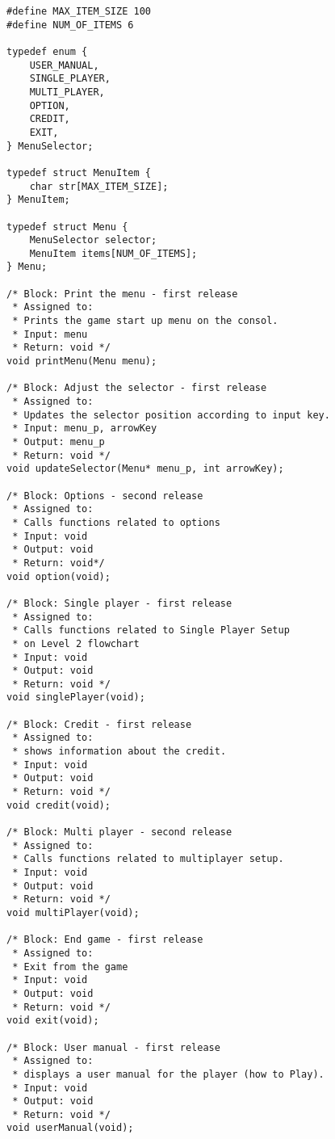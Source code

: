 \begin{verbatim}
#define MAX_ITEM_SIZE 100
#define NUM_OF_ITEMS 6

typedef enum {
	USER_MANUAL,
	SINGLE_PLAYER,
	MULTI_PLAYER,
	OPTION,
	CREDIT,
	EXIT,	
} MenuSelector;

typedef struct MenuItem {
	char str[MAX_ITEM_SIZE];
} MenuItem;

typedef struct Menu {
	MenuSelector selector;
	MenuItem items[NUM_OF_ITEMS];
} Menu;

/* Block: Print the menu - first release
 * Assigned to:
 * Prints the game start up menu on the consol.
 * Input: menu
 * Return: void */
void printMenu(Menu menu);

/* Block: Adjust the selector - first release
 * Assigned to:
 * Updates the selector position according to input key.
 * Input: menu_p, arrowKey
 * Output: menu_p
 * Return: void */
void updateSelector(Menu* menu_p, int arrowKey);

/* Block: Options - second release
 * Assigned to:
 * Calls functions related to options
 * Input: void
 * Output: void
 * Return: void*/
void option(void);

/* Block: Single player - first release
 * Assigned to:
 * Calls functions related to Single Player Setup 
 * on Level 2 flowchart
 * Input: void 
 * Output: void
 * Return: void */
void singlePlayer(void);

/* Block: Credit - first release
 * Assigned to:
 * shows information about the credit.
 * Input: void 
 * Output: void
 * Return: void */
void credit(void);

/* Block: Multi player - second release
 * Assigned to:
 * Calls functions related to multiplayer setup.
 * Input: void 
 * Output: void
 * Return: void */
void multiPlayer(void);

/* Block: End game - first release
 * Assigned to:
 * Exit from the game
 * Input: void 
 * Output: void
 * Return: void */
void exit(void);

/* Block: User manual - first release
 * Assigned to:
 * displays a user manual for the player (how to Play).
 * Input: void 
 * Output: void
 * Return: void */
void userManual(void);
\end{verbatim}